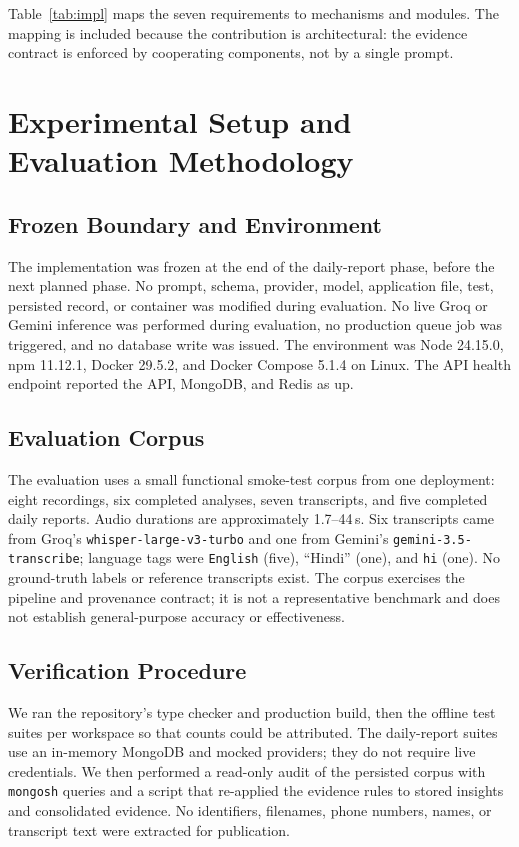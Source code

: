 \documentclass[10pt,a4paper]{article}
\newcommand{\code}[1]{\texttt{#1}}
\begin{document}
Table~\ref{tab:impl} maps the seven requirements to mechanisms and modules. The mapping is
included because the contribution is architectural: the evidence contract is enforced by
cooperating components, not by a single prompt.

\section{Experimental Setup and Evaluation Methodology}

\subsection{Frozen Boundary and Environment}

The implementation was frozen at the end of the daily-report phase, before the next planned
phase. No prompt, schema, provider, model, application file, test, persisted record, or
container was modified during evaluation. No live Groq or Gemini inference was performed during
evaluation, no production queue job was triggered, and no database write was issued. The environment
was Node 24.15.0, npm 11.12.1, Docker 29.5.2, and Docker Compose 5.1.4 on Linux. The API
health endpoint reported the API, MongoDB, and Redis as up.

\subsection{Evaluation Corpus}

The evaluation uses a small functional smoke-test corpus from one deployment: eight
recordings, six completed analyses, seven transcripts, and five completed daily reports.
Audio durations are approximately 1.7--44\,s. Six transcripts came from Groq's
\code{whisper-large-v3-turbo} and one from Gemini's \code{gemini-3.5-transcribe}; language
tags were \code{English} (five), ``Hindi'' (one), and \code{hi} (one). No ground-truth
labels or reference transcripts exist. The corpus exercises the pipeline and provenance
contract; it is not a representative benchmark and does not establish general-purpose
accuracy or effectiveness.

\subsection{Verification Procedure}

We ran the repository's type checker and production build, then the offline test suites per
workspace so that counts could be attributed. The daily-report suites use an in-memory
MongoDB and mocked providers; they do not require live credentials. We then performed a
read-only audit of the persisted corpus with \code{mongosh} queries and a script that
re-applied the evidence rules to stored insights and consolidated evidence. No identifiers,
filenames, phone numbers, names, or transcript text were extracted for publication.
\end{document}
